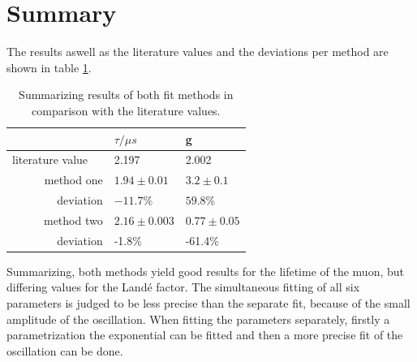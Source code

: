 \documentclass{include/thesisclass3}
\begin{document}
\section{Summary}
The results aswell as the literature values and the deviations per method are shown in table \ref{tablö}.\\

\begin{table}[H]
\caption{\label{tablö}Summarizing results of both fit methods in comparison with the literature values.}
\begin{center}
\begin{tabular}{r|ll}
 & $\tau /\mu s$ & g \\ 
\toprule
literature value $\quad$& 2.197 & 2.002 \\ 
\midrule
method one & $1.94 \pm 0.01$ & $3.2\pm 0.1$ \\ 
deviation & $-11.7$\% & $59.8$\% \\ 
\midrule 
method two & $2.16 \pm 0.003$ & $ 0.77 \pm 0.05$ \\  
deviation & -1.8\% & -61.4\%  
\label{tablö}
\end{tabular} 
\end{center}
\end{table}

Summarizing, both methods yield good results for the lifetime of the muon, but differing values for the Landé factor. 
The simultaneous fitting of all six parameters is judged to be less precise than the separate fit, because of the small amplitude of the oscillation.
When fitting the parameters separately, firstly a parametrization the exponential can be fitted and then a more precise fit of the oscillation can be done.  
\end{document}
